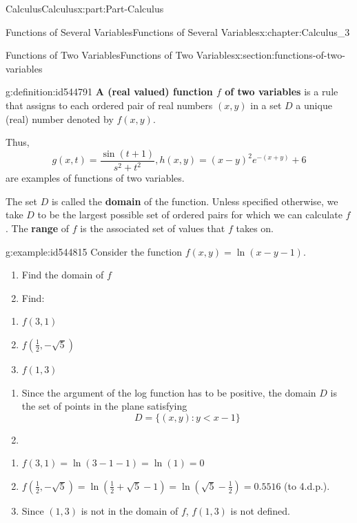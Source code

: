 \documentclass[oneside,10pt,]{book}
\newcommand{\terminology}[1]{\textbf{#1}}
\numberwithin{equation}{section}
\newcommand{\lt}{<}
\begin{document}
\begin{partptx}{Calculus}{}{Calculus}{}{}{x:part:Part-Calculus}
\begin{chapterptx}{Functions of Several Variables}{}{Functions of Several Variables}{}{}{x:chapter:Calculus_3}
\begin{sectionptx}{Functions of Two Variables}{}{Functions of Two Variables}{}{}{x:section:functions-of-two-variables}
\begin{definition}{}{g:definition:id544791}
\terminology{A (real valued) function \(f\) of two variables} is a rule that assigns to each ordered pair of real numbers \((x,y)\) in a set \(D\) a unique (real) number denoted by \(f(x,y)\).\end{definition}
 Thus,%
\begin{equation*}
g(x,t)=\frac{\sin(t+1)}{s^2+t^2}, h(x,y)=(x-y)^2e^{-(x+y)}+6
\end{equation*}
are examples of functions of two variables.%
\par
The set \(D\) is called the \terminology{domain} of the function. Unless specified otherwise, we take \(D\) to be the largest possible set of ordered pairs for which we can calculate \(f\). The \terminology{range} of \(f\) is the associated set of values that \(f\) takes on.%
\begin{example}{}{g:example:id544815}%
Consider the function \(f(x,y)=\ln(x-y-1)\).%
\par
%
\begin{enumerate}[label=\alph*.]
\item{}Find the domain of \(f\)%
\item{}Find:%
\end{enumerate}
%
\par
%
\begin{enumerate}[label=\roman*.]
\item{}\(\displaystyle f(3,1)\)%
\item{}\(\displaystyle f(\frac{1}{2},-\sqrt{5})\)%
\item{}\(\displaystyle f(1,3)\)%
\end{enumerate}
%
\par\smallskip%
\noindent\hypertarget{g:solution:id544853}{}%
\begin{enumerate}[label=\alph*.]
\item{}Since the argument of the log function has to be positive, the domain \(D\) is the set of points in the plane satisfying%
\begin{equation*}
D=\{(x,y):y \lt x-1\}
\end{equation*}
%
\item{}%
\end{enumerate}
%
\par
%
\begin{enumerate}[label=\roman*.]
\item{}\(\displaystyle f(3,1)=\ln(3-1-1)=\ln(1)=0\)%
\item{}\(f(\frac{1}{2},-\sqrt{5})=\ln(\frac{1}{2}+\sqrt{5}-1)=\ln(\sqrt{5}-\frac{1}{2})=0.5516\) (to 4.d.p.).%
\item{}Since \((1,3)\) is not in the domain of \(f\), \(f(1,3)\) is not defined.%

\end{enumerate}
\end{example}
\end{sectionptx}
\end{chapterptx}
\end{partptx}
\end{document}
